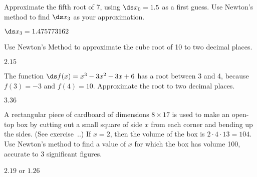 \begin{exercises}

\begin{exercise} Approximate the fifth root of 7, using $\ds x_0=1.5$ as a
first guess. Use Newton's method to find $\ds x_3$ as your
approximation.  
\begin{answer} $\ds x_3=1.475773162$ 
\end{answer}\end{exercise}

\begin{exercise} Use Newton's Method to approximate the cube root of 10 to
two decimal places.
\begin{answer} $2.15$
\end{answer}\end{exercise}

\begin{exercise} The function 
$\ds f(x)=x^3-3x^2-3x+6$ has a root between 3 and 4, because
$f(3)=-3$ and $f(4)=10$. Approximate the root to two decimal places.
\begin{answer}  $3.36$
\end{answer}\end{exercise}

\begin{exercise} A rectangular piece of cardboard of dimensions $8\times 17$
is used to make an open-top box by cutting out a small square of side
$x$ from each corner and bending up the sides.  (See
exercise~..)
If $x=2$, then the volume of the box is $2\cdot 4\cdot 13=104$.  Use
Newton's method to find a value of $x$ for which the box has volume
100, accurate to 3 significant figures.  
\begin{answer} $2.19$ or $1.26$
\end{answer}\end{exercise}


\end{exercises}
